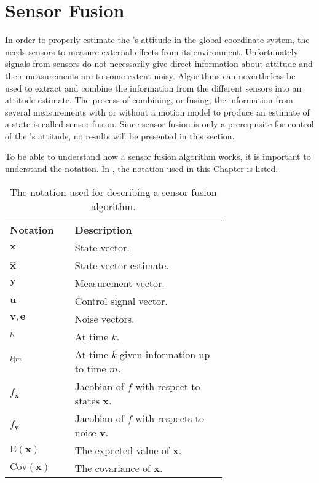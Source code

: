 \chapter{Sensor Fusion}\label{cha:sensor_fusion}
In order to properly estimate the \abbrROV's attitude in the global coordinate system, the \abbrROV needs sensors to measure external effects from its environment.
Unfortunately signals from sensors do not necessarily give direct information about attitude and their measurements are to some extent noisy. Algorithms can nevertheless be used to extract and combine the information from the different sensors into an attitude estimate. The process of combining, or fusing, the information from several measurements with or without a motion model to produce an estimate of a state is called sensor fusion. Since sensor fusion is only a prerequisite for control of the \abbrROV's attitude, no results will be presented in this section. 

To be able to understand how a sensor fusion algorithm works, it is important to understand the notation. In  , the notation used in this Chapter is listed.
 \begin{table}[htbp]
  \centering
  \caption{\label{tab:notationKalman}%
    The notation used for describing a sensor fusion algorithm.}
    \begin{tabular}{l p{0.7\linewidth}}
    \toprule%
    \textbf{Notation} & \textbf{Description} \\
    \otoprule%
    $\boldsymbol{x}$ & State vector.\\
    $\hat{\boldsymbol{x}}$ & State vector estimate.\\
    $\boldsymbol{y}$ & Measurement vector.\\
    $\boldsymbol{u}$ & Control signal vector.\\
    $\boldsymbol{v},\boldsymbol{e}$ & Noise vectors.\\
    $_k$ & At time $k$.\\
    $_{k|m}$ & At time $k$ given information up to time $m$.\\
    $f_{\boldsymbol{x}}$ & Jacobian of $f$ with respect to states $\boldsymbol{x}$.\\
    $f_{\boldsymbol{v}}$ & Jacobian of $f$ with respects to noise $\boldsymbol{v}$.\\
    $\text{E}(\boldsymbol{x})$ & The expected value of $\boldsymbol{x}$.\\
    $\text{Cov}(\boldsymbol{x})$ & The covariance of $\boldsymbol{x}$.\\
    \bottomrule%
 \end{tabular}
\end{table}

